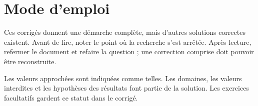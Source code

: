 \documentclass[11pt,a4paper,oneside]{book}
\begin{document}
\frontmatter
\chapter*{Mode d'emploi}
Ces corrigés donnent une démarche complète, mais d'autres solutions correctes existent. Avant de lire, noter le point où la recherche s'est arrêtée. Après lecture, refermer le document et refaire la question ; une correction comprise doit pouvoir être reconstruite.

Les valeurs approchées sont indiquées comme telles. Les domaines, les valeurs interdites et les hypothèses des résultats font partie de la solution. Les exercices facultatifs gardent ce statut dans le corrigé.
\tableofcontents
\mainmatter

























\end{document}
